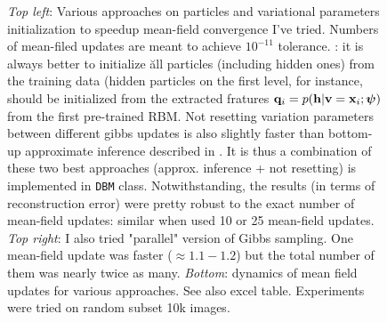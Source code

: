\begin{figure}[h]
\begin{mdframed}
\caption{\emph{Top left}: Various approaches on particles and variational parameters initialization to speedup mean-field convergence I've tried. Numbers of mean-filed updates are meant to achieve $10^{-11}$ tolerance. : it is always better to initialize \u{all} particles (including hidden ones) from the training data (hidden particles on the first level, for instance, should be initialized from the extracted fratures $\mathbf{q}_i=p(\mathbf{h}|\mathbf{v}=\mathbf{x}_i;\boldsymbol{\psi})$ from the first pre-trained RBM. Not resetting variation parameters between different gibbs updates is also slightly faster than bottom-up approximate inference described in \cite{salakhutdinov2009deep, salakhutdinov2010efficient}. It is thus a combination of these two best approaches (approx. inference + not resetting) is implemented in \texttt{DBM} class. Notwithstanding, the results (in terms of reconstruction error) were pretty robust to the exact number of mean-field updates: similar when used 10 or 25 mean-field updates. \emph{Top right}: I also tried "parallel" version of Gibbs sampling. One mean-field update was faster ($\approx 1.1-1.2$) but the total number of them was nearly twice as many. \emph{Bottom}: dynamics of mean field updates for various approaches. See also excel table. Experiments were tried on random subset 10k images.}
\end{mdframed}
\end{figure}

\clearpage

